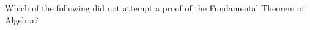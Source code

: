 \documentclass[nooutcomes]{ximera}
\begin{document}
\begin{question}
Which of the following did not attempt a proof of the Fundamental Theorem of Algebra?
\begin{multipleChoice}
\end{multipleChoice}
\end{question}

%
%
\end{document}
